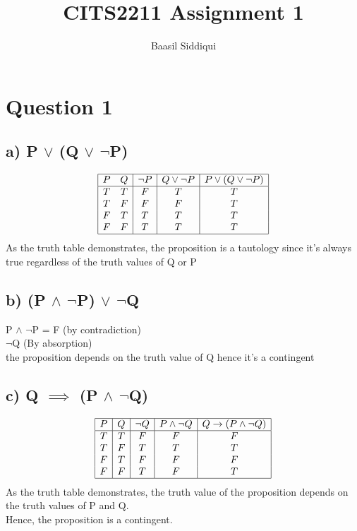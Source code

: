 \documentclass[a4paper]{article}
\title{\textbf{CITS2211 Assignment 1}}
\author{Baasil Siddiqui}
\date{}
\begin{document}
\parskip 2mm
\maketitle
\thispagestyle{empty}

\section*{Question 1}

\subsection*{a) P $\lor$ (Q $\lor$ $\neg$P)}

\begin{displaymath}
    \begin{array}{|c c| c | c | c |}
        \hline
        P & Q & \neg P & Q \lor \neg P & P \lor (Q \lor \neg P)\\
        \hline
        T & T & F & T & T\\
        T & F & F & F & T\\
        F & T & T & T & T\\
        F & F & T & T & T\\
        \hline
    \end{array}
\end{displaymath}
%
As the truth table demonstrates, the proposition is a tautology since
it's always true regardless of the truth values of Q or P


\subsection*{b) (P $\land$ $\neg$P) $\lor$ $\neg$Q}

P $\land$ $\neg$P = F (by contradiction)\\
$\neg$Q \hspace{36pt} (By absorption)\\
\newline
the proposition depends on the truth value of Q hence it's a contingent


\subsection*{c) Q $\implies$ (P $\land$ $\neg$Q)}

\begin{displaymath}
    \begin{array}{|c|c|c|c|c|}
        \hline
        P & Q & \neg Q & P \land \neg Q & Q \rightarrow (P \land \neg Q) \\
        \hline
        T & T & F & F & F \\
        T & F & T & T & T \\
        F & T & F & F & F \\
        F & F & T & F & T \\
        \hline
    \end{array}
\end{displaymath}
%
As the truth table demonstrates, the truth value of the proposition depends on
the truth values of P and Q.\\
Hence, the proposition is a contingent.
\end{document}
